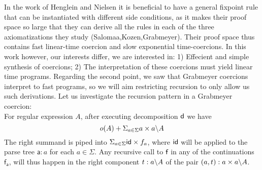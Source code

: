 \documentclass[a4paper,UKenglish,cleveref, autoref, thm-restate]{lipics-v2021}
\begin{document}

In the work of Henglein and Nielsen it is beneficial to have a general fixpoint rule that can be instantiated with different side conditions, as it makes their proof space so large that they can derive all the rules in each of the three axiomatizations they study (Salomaa,Kozen,Grabmeyer). Their proof space thus contains fast linear-time coercion and slow exponential time-coercions. In this work however, our interests differ, we are interested in: 1) Effecient and simple synthesis of coercions; 2) The interpretation of these coercions must yield linear time programs.
Regarding the second point, we saw that Grabmeyer coercions interpret to fast programs, so we will aim restricting recursion to only allow us such derivations. Let us investigate the recursion pattern in a Grabmeyer coercion:\\
For regular expression $A$, after executing decomposition $\textsf{d}$ we have 
 \[ o(A) + \Sigma_{a \in \Sigma} a\times a \backslash A \]
 The right summand is piped into $\Sigma_{a \in \Sigma} \textsf{id}\times f_a$, where $\textsf{id}$ will be applied to the parse tree $\mathsf{a} : a$ for each $a \in \Sigma$. Any recursive call to $\textsf{f}$ in any of the continuations $\mathsf{f_a}$, will thus happen in the right component $\mathsf{t} : \derive{a}{A}$ of the pair $(\mathsf{a},\mathsf{t}) : a \times \derive{a}{A}$. 
\end{document}
